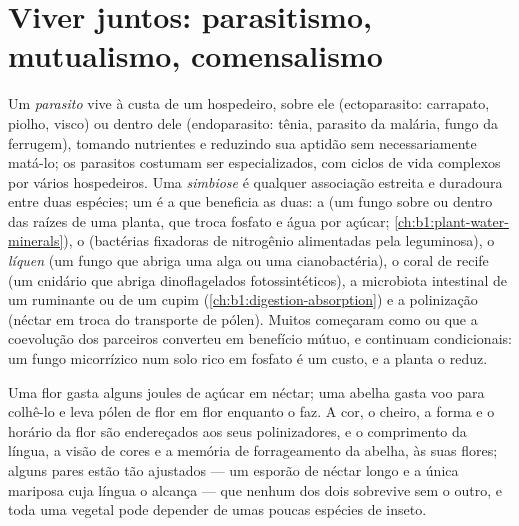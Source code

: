 \section{Viver juntos: parasitismo, mutualismo, comensalismo}

\begin{definition}\label{def:b1:species-interactions:symbiosis}
Um \emph{parasito} vive à custa de um hospedeiro, sobre ele
(ectoparasito: carrapato, piolho, visco) ou dentro dele
(endoparasito: tênia, parasito da malária, fungo da ferrugem),
tomando nutrientes e reduzindo sua aptidão sem necessariamente
matá-lo; os parasitos costumam ser especializados, com ciclos de vida
complexos por vários hospedeiros. Uma \emph{simbiose} é qualquer
associação estreita e duradoura entre duas espécies; um
\emph{} é a que beneficia as duas: a  (um fungo
sobre ou dentro das raízes de uma planta, que troca fosfato e água por
açúcar; \cref{ch:b1:plant-water-minerals}), o 
(bactérias fixadoras de nitrogênio alimentadas pela leguminosa), o
\emph{líquen} (um fungo que abriga uma alga ou uma cianobactéria), o
coral de recife (um cnidário que abriga dinoflagelados
fotossintéticos), a microbiota intestinal de um ruminante ou de um
cupim (\cref{ch:b1:digestion-absorption}) e a polinização (néctar em
troca do transporte de pólen). Muitos  começaram como
 ou  que a coevolução dos parceiros converteu em
benefício mútuo, e continuam condicionais: um fungo micorrízico num
solo rico em fosfato é um custo, e a planta o reduz.
\end{definition}

\begin{example}\label{ex:b1:species-interactions:pollination}
Uma flor gasta alguns joules de açúcar em néctar; uma abelha gasta voo
para colhê-lo e leva pólen de flor em flor enquanto o faz. A cor, o
cheiro, a forma e o horário da flor são endereçados aos seus
polinizadores, e o comprimento da língua, a visão de cores e a memória
de forrageamento da abelha, às suas flores; alguns pares estão tão
ajustados --- um esporão de néctar longo e a única mariposa cuja
língua o alcança --- que nenhum dos dois sobrevive sem o outro, e toda
uma  vegetal pode depender de umas poucas espécies de
inseto.
\end{example}

